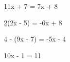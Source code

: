 \begin{pageenonces}
    \begin{tcolorbox}[carteenonce={9}]
        11x + 7 = 7x + 8
    \end{tcolorbox}
    \begin{tcolorbox}[carteenonce={10}]
        2(2x - 5) = -6x + 8
    \end{tcolorbox}
    \begin{tcolorbox}[carteenonce={11}]
        4 - (9x - 7) = -5x - 4
    \end{tcolorbox}
    \begin{tcolorbox}[carteenonce={12}]
        10x - 1 = 11
    \end{tcolorbox}
\end{pageenonces}

